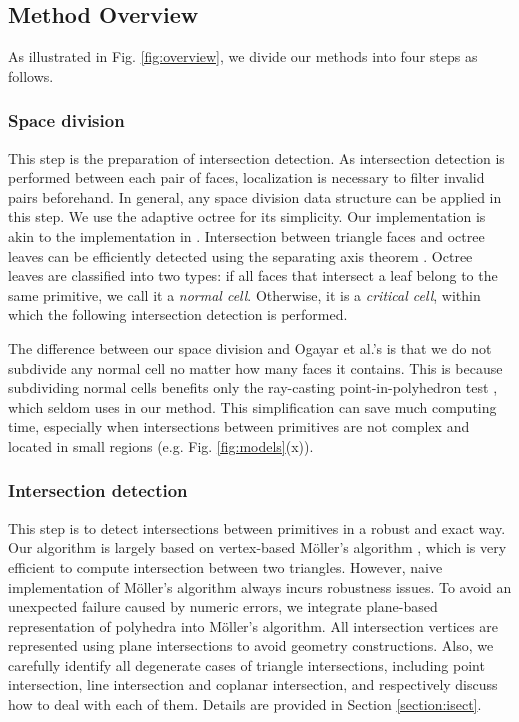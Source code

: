 \documentclass[10pt,journal,compsoc]{IEEEtran}
\begin{document}
\subsection{Method Overview}


As illustrated in Fig. \ref{fig:overview}, we divide our methods into four steps as follows.

\subsubsection{Space division}

This step is the preparation of intersection detection. As intersection detection is performed between each pair of faces, localization is necessary to filter invalid pairs beforehand. In general, any space division data structure can be applied in this step. We use the adaptive octree for its simplicity. Our implementation is akin to the implementation in \cite{ogayar2015deferred}. Intersection between triangle faces and octree leaves can be efficiently detected using the separating axis theorem \cite{gottschalk1996obbtree}. Octree leaves are classified into two types: if all faces that intersect a leaf belong to the same primitive, we call it a \emph{normal cell}. Otherwise, it is a \emph{critical cell}, within which the following intersection detection is performed.

The difference between our space division and Ogayar et al.'s is that we do not subdivide any normal cell no matter how many faces it contains. This is because subdividing normal cells benefits only the ray-casting point-in-polyhedron test  \cite{frisken2002simple}, which seldom uses in our method. This simplification can save much computing time, especially when intersections between primitives are not complex and located in small regions (e.g. Fig. \ref{fig:models}(x)).

\subsubsection{Intersection detection}

This step is to detect intersections between primitives in a robust and exact way. Our algorithm is largely based on vertex-based M\"{o}ller's algorithm \cite{moller1997fast}, which is very efficient to compute intersection between two triangles. However, naive implementation of M\"{o}ller's algorithm always incurs robustness issues. To avoid an unexpected failure caused by numeric errors, we integrate plane-based representation of polyhedra into M\"{o}ller's algorithm. All intersection vertices are represented using plane intersections to avoid geometry constructions. Also, we carefully identify all degenerate cases of triangle intersections, including point intersection, line intersection and coplanar intersection, and respectively discuss how to deal with each of them. Details are provided in Section \ref{section:isect}.
\end{document}

